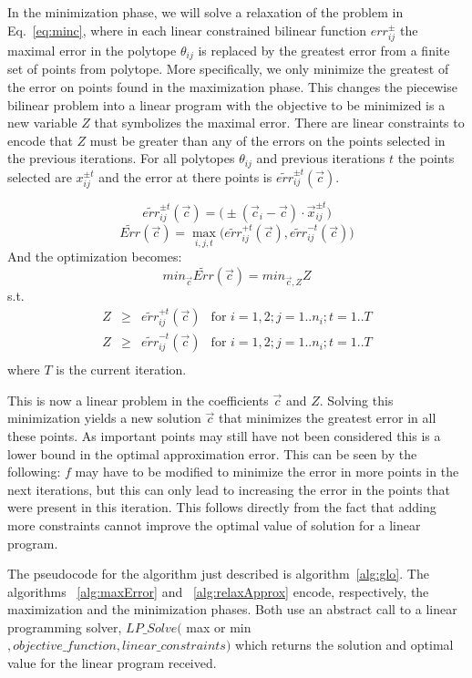 In the minimization phase, we will solve a relaxation of the problem in Eq.~\ref{eq:minc}, where in each linear constrained bilinear function $err^{\pm}_{ij}$ the maximal error in the polytope $\theta_{ij}$ is replaced by the greatest error from a finite set of points from polytope. More specifically, we only minimize the greatest of the error on points found in the maximization phase. This changes the piecewise bilinear problem into a linear program with the objective to be minimized is a new variable $Z$ that symbolizes the maximal error. There are linear constraints to encode that $Z$ must be greater than any of the errors on the points selected in the previous iterations. For all polytopes $\theta_{ij}$ and previous iterations $t$ the points selected are $x^{\pm t}_{ij}$ and the error at there points is $\tilde{err}_{ij}^{\pm t}(\vec{c})$.

$$ \tilde{err}_{ij}^{\pm t} (\vec{c}) = \big( \pm (\vec{c}_i - \vec{c})\cdot \vec{x}_{ij}^{\pm t} \big)$$
$$ \tilde{Err}(\vec{c}) =\max_{i,j,t} \big( \tilde{err}^{+t}_{ij} (\vec{c}), \tilde{err}^{-t}_{ij} (\vec{c}) \big)$$
And the optimization becomes:
$$min_{\vec{c}}\tilde{Err}({\vec{c}}) = min_{{\vec{c}},Z}  Z $$
s.t. 
$$
	\begin{array}{llll}
		Z & \geq & \tilde{err}_{ij}^{+t} (\vec{c}) & \mbox{for } i=1,2; j = 1..n_i; t=1..T\\
		Z & \geq & \tilde{err}_{ij}^{-t} (\vec{c}) & \mbox{for } i=1,2; j = 1..n_i; t=1..T\\
	\end{array}
$$
where $T$ is the current iteration.

This is now a linear problem in the coefficients $\vec{c}$ and $Z$. Solving this minimization yields a new solution $\vec{c}$ that minimizes the greatest error in all these points. As important points may still have not been considered this is a lower bound in the optimal approximation error. This can be seen by the following: $f$ may have to be modified to minimize the error in more points in the next iterations, but this can only lead to increasing the error in the points that were present in this iteration. This follows directly from the fact that adding more constraints cannot improve the optimal value of solution for a linear program.

The pseudocode for the algorithm just described is algorithm~\ref{alg:glo}. The algorithms ~\ref{alg:maxError} and ~\ref{alg:relaxApprox} encode, respectively, the maximization and the minimization phases. Both use an abstract call to a linear programming solver, $LP\_Solve($ max or min$, objective\_function, linear\_constraints)$ which returns the solution and optimal value for the linear program received.

